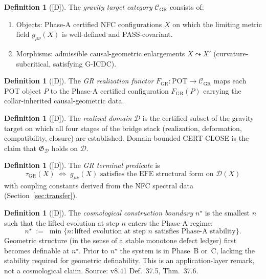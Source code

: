 \documentclass[12pt,oneside]{amsbook}
\theoremstyle{plain}
\theoremstyle{definition}
\newtheorem{definition}[theorem]{Definition}
\theoremstyle{remark}
\newcommand{\status}[1]{\textup{[#1]}}
\begin{document}
\begin{definition}[\status{D}]\label{def:gr-target-cat}
The \emph{gravity target category} $\mathcal{C}_{\mathrm{GR}}$
consists of:
\begin{enumerate}[label=\textup{(\arabic*)}]
 \item Objects: Phase-A certified NFC configurations $X$ on
 which the limiting metric field $g_{\mu\nu}(X)$ is
 well-defined and PASS-covariant.
 \item Morphisms: admissible causal-geometric enlargements
 $X \leadsto X'$ (curvature-subcritical, satisfying
 G-ICDC).
\end{enumerate}
\end{definition}

\begin{definition}[\status{D}]\label{def:gr-functor}
The \emph{GR realization functor}
$F_{\mathrm{GR}} : \mathrm{POT} \to \mathcal{C}_{\mathrm{GR}}$
maps each POT object $P$ to the Phase-A certified configuration
$F_{\mathrm{GR}}(P)$ carrying the collar-inherited causal-geometric
data.
\end{definition}

\begin{definition}[\status{D}]\label{def:realized-domain}
The \emph{realized domain} $\mathcal{D}$ is the certified subset
of the gravity target on which all four stages of the bridge stack
(realization, deformation, compatibility, closure) are established.
Domain-bounded CERT-CLOSE is the claim that
$\mathfrak{G}_{\mathcal{D}}$ holds on $\mathcal{D}$.
\end{definition}

\begin{definition}[\status{D}]\label{def:gr-terminal-pred}
The \emph{GR terminal predicate} is
\[
 \tau_{\mathrm{GR}}(X)
 \;\iff\;
 g_{\mu\nu}(X) \text{ satisfies the EFE structural form on }
 \mathcal{D}(X)
\]
with coupling constants derived from the NFC spectral data
(Section~\ref{sec:transfer}).
\end{definition}

\begin{definition}[\status{D}]\label{def:cosmological-boundary}
The \emph{cosmological construction boundary} $n^\star$ is the
smallest $n$ such that the lifted evolution at step $n$ enters
the Phase-A regime:
\[
 n^\star \;:=\; \min\{n : \text{lifted evolution at step } n
 \text{ satisfies Phase-A stability}\}.
\]
Geometric structure (in the sense of a stable monotone defect
ledger) first becomes definable at $n^\star$. Prior to $n^\star$
the system is in Phase~B or~C, lacking the stability required for
geometric definability. This is an application-layer remark, not
a cosmological claim. Source: v8.41 Def.~37.5, Thm.~37.6.
\end{definition}
\end{document}
